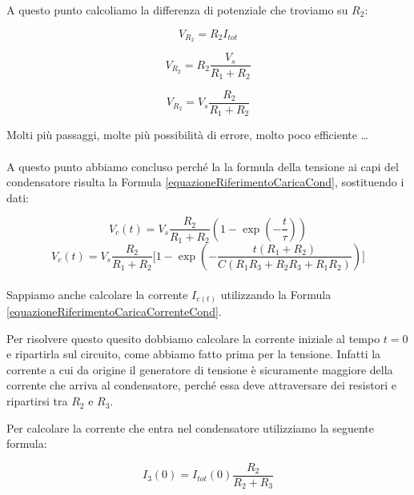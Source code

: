 A questo punto calcoliamo la differenza di potenziale che troviamo su $R_2:$

\begin{equation*}
    V_{R_2}  = R_2 I_{tot}
\end{equation*}

\begin{equation*}
    V_{R_2} = R_2 \frac{V_s}{R_1 + R_2}
\end{equation*}

\begin{equation*}
    V_{R_2}  = V_s \frac{R_2}{R_1 + R_2}
\end{equation*}

Molti più passaggi, molte più possibilità di errore, molto poco efficiente \dots

\paragraph{}
A questo punto abbiamo concluso perché la la formula della tensione ai capi del condensatore  risulta la Formula \ref{equazioneRiferimentoCaricaCond}, sostituendo i dati:

\begin{equation*}
    V_c(t) = V_s \frac{R_2}{R_1 + R_2}(1-\exp(-\frac{t}{\tau}))
\end{equation*}
\begin{equation*}
    V_c(t) = V_s \frac{R_2}{R_1 + R_2}\biggl[1-\exp(-\frac{t(R_1 + R_2)}{C(R_1R_3 + R_2R_3 + R_1R_2)})\biggl]
\end{equation*}

\paragraph{}

Sappiamo anche calcolare la corrente $I_{c(t)}$ utilizzando la Formula \ref{equazioneRiferimentoCaricaCorrenteCond}.

Per risolvere questo quesito dobbiamo calcolare la corrente iniziale al tempo $t=0$ e ripartirla sul circuito, come abbiamo fatto prima per la tensione. Infatti la corrente a cui da origine il generatore di tensione è sicuramente maggiore della corrente che arriva al condensatore, perché essa deve attraversare dei resistori e ripartirsi tra $R_2$ e $R_3$.

Per calcolare la corrente che entra nel condensatore utilizziamo la seguente formula:

\begin{equation*}
    I_3(0) = I_{tot}(0) \frac{R_2}{R_2 + R_3}
\end{equation*}

